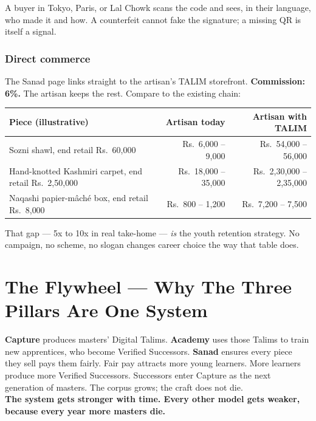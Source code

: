 \documentclass[11pt, a4paper]{article}
\begin{document}
A buyer in Tokyo, Paris, or Lal Chowk scans the code and sees, in their language, who made it and how. A counterfeit cannot fake the signature; a missing QR is itself a signal.

\subsubsection{Direct commerce}

The Sanad page links straight to the artisan's TALIM storefront. \textbf{Commission: 6\%.} The artisan keeps the rest. Compare to the existing chain:

\begin{center}
\small
\begin{tabularx}{\linewidth}{Xrr}
\toprule
\textbf{Piece (illustrative)} & \textbf{Artisan today} & \textbf{Artisan with TALIM} \\
\midrule
Sozni shawl, end retail Rs.\ 60{,}000 & Rs.\ 6{,}000 -- 9{,}000 & Rs.\ 54{,}000 -- 56{,}000 \\
Hand-knotted Kashmiri carpet, end retail Rs.\ 2{,}50{,}000 & Rs.\ 18{,}000 -- 35{,}000 & Rs.\ 2{,}30{,}000 -- 2{,}35{,}000 \\
Naqashi papier-m\^{a}ch\'{e} box, end retail Rs.\ 8{,}000 & Rs.\ 800 -- 1{,}200 & Rs.\ 7{,}200 -- 7{,}500 \\
\bottomrule
\end{tabularx}
\end{center}

That gap — 5x to 10x in real take-home — \textit{is} the youth retention strategy. No campaign, no scheme, no slogan changes career choice the way that table does.

\section{The Flywheel — Why The Three Pillars Are One System}

\begin{insightbox}
\textbf{Capture} produces masters' Digital Talims. \textbf{Academy} uses those Talims to train new apprentices, who become Verified Successors. \textbf{Sanad} ensures every piece they sell pays them fairly. Fair pay attracts more young learners. More learners produce more Verified Successors. Successors enter Capture as the next generation of masters. The corpus grows; the craft does not die.\\[5pt]
\textbf{The system gets stronger with time. Every other model gets weaker, because every year more masters die.}
\end{insightbox}
\end{document}
